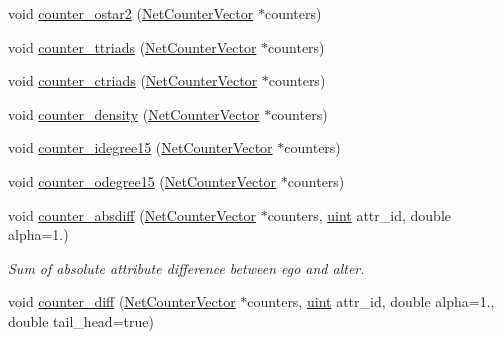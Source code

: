 \begin{Indent}
\begin{DoxyCompactItemize}
void \hyperlink{namespacebarry_1_1counters_1_1network_af76d9df31e55422bdffdb9e56870a46f}{counter\+\_\+ostar2} (\hyperlink{namespacebarry_1_1counters_1_1network_a3b3c590303d47840d1967372ae495d95}{Net\+Counter\+Vector} $\ast$counters)
\item 
void \hyperlink{namespacebarry_1_1counters_1_1network_ab3a9cd11d47c9c1d5652c28d139047c8}{counter\+\_\+ttriads} (\hyperlink{namespacebarry_1_1counters_1_1network_a3b3c590303d47840d1967372ae495d95}{Net\+Counter\+Vector} $\ast$counters)
\item 
void \hyperlink{namespacebarry_1_1counters_1_1network_a5262c1e8a14c9956041adead348a4890}{counter\+\_\+ctriads} (\hyperlink{namespacebarry_1_1counters_1_1network_a3b3c590303d47840d1967372ae495d95}{Net\+Counter\+Vector} $\ast$counters)
\item 
void \hyperlink{namespacebarry_1_1counters_1_1network_a313ba439c81c589759cbbc613d12e80b}{counter\+\_\+density} (\hyperlink{namespacebarry_1_1counters_1_1network_a3b3c590303d47840d1967372ae495d95}{Net\+Counter\+Vector} $\ast$counters)
\item 
void \hyperlink{namespacebarry_1_1counters_1_1network_a148e6fbb549eea53ff6d744b0f683ed6}{counter\+\_\+idegree15} (\hyperlink{namespacebarry_1_1counters_1_1network_a3b3c590303d47840d1967372ae495d95}{Net\+Counter\+Vector} $\ast$counters)
\item 
void \hyperlink{namespacebarry_1_1counters_1_1network_a7a43854f3227f5f92d3ff580e99c7136}{counter\+\_\+odegree15} (\hyperlink{namespacebarry_1_1counters_1_1network_a3b3c590303d47840d1967372ae495d95}{Net\+Counter\+Vector} $\ast$counters)
\item 
void \hyperlink{namespacebarry_1_1counters_1_1network_acc210d80021cb5a79f1a9daf097e1c99}{counter\+\_\+absdiff} (\hyperlink{namespacebarry_1_1counters_1_1network_a3b3c590303d47840d1967372ae495d95}{Net\+Counter\+Vector} $\ast$counters, \hyperlink{namespacebarry_a11dfc53ddb4672278319aa04f1e09a6c}{uint} attr\+\_\+id, double alpha=1.)
\begin{DoxyCompactList}\small\item\em Sum of absolute attribute difference between ego and alter. \end{DoxyCompactList}\item 
void \hyperlink{namespacebarry_1_1counters_1_1network_af8f024a17f6c518aef79c2cf670e49f5}{counter\+\_\+diff} (\hyperlink{namespacebarry_1_1counters_1_1network_a3b3c590303d47840d1967372ae495d95}{Net\+Counter\+Vector} $\ast$counters, \hyperlink{namespacebarry_a11dfc53ddb4672278319aa04f1e09a6c}{uint} attr\+\_\+id, double alpha=1., double tail\+\_\+head=true)

\end{DoxyCompactItemize}
\end{Indent}
